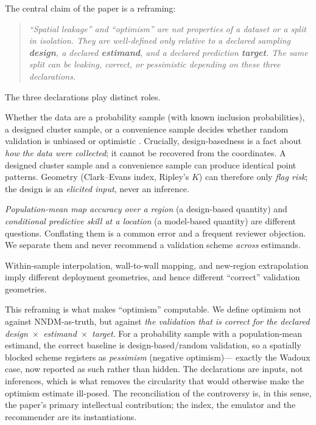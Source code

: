 \documentclass[11pt,a4paper]{article}
\begin{document}
The central claim of the paper is a reframing:

\begin{quote}\itshape
``Spatial leakage'' and ``optimism'' are not properties of a dataset or a split in
isolation. They are well-defined only relative to a declared sampling
\textbf{design}, a declared \textbf{estimand}, and a declared prediction
\textbf{target}. The same split can be leaking, correct, or pessimistic depending
on these three declarations.
\end{quote}

\noindent The three declarations play distinct roles.

\begin{description}[leftmargin=0pt,itemsep=3pt]
\item[Sampling design.] Whether the data are a probability sample (with known
  inclusion probabilities), a designed cluster sample, or a convenience sample
  decides whether random validation is unbiased \citep{wadoux2021spatial,
  debruin2022clustered} or optimistic \citep{mila2022nndm}. Crucially,
  design-basedness is a fact about \emph{how the data were collected}; it cannot be
  recovered from the coordinates. A designed cluster sample and a convenience
  sample can produce identical point patterns. Geometry (Clark--Evans index,
  Ripley's $K$) can therefore only \emph{flag risk}; the design is an
  \emph{elicited input}, never an inference.
\item[Estimand.] \emph{Population-mean map accuracy over a region} (a design-based
  quantity) and \emph{conditional predictive skill at a location} (a model-based
  quantity) are different questions. Conflating them is a common error and a
  frequent reviewer objection. We separate them and never recommend a validation
  scheme \emph{across} estimands.
\item[Prediction target.] Within-sample interpolation, wall-to-wall mapping, and
  new-region extrapolation imply different deployment geometries, and hence
  different ``correct'' validation geometries.
\end{description}

This reframing is what makes ``optimism'' computable. We define optimism not
against NNDM-as-truth, but against \emph{the validation that is correct for the
declared design~$\times$~estimand~$\times$~target}. For a probability sample with a
population-mean estimand, the correct baseline is design-based/random validation,
so a spatially blocked scheme registers as \emph{pessimism} (negative optimism)---
exactly the Wadoux case, now reported as such rather than hidden. The declarations
are inputs, not inferences, which is what removes the circularity that would
otherwise make the optimism estimate ill-posed. The reconciliation of the
controversy is, in this sense, the paper's primary intellectual contribution; the
index, the emulator and the recommender are its instantiations.
\end{document}
